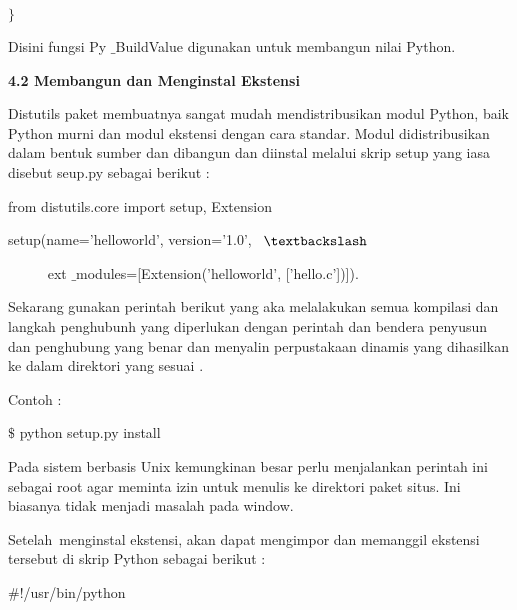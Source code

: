 \noindent 
 $  \}  $ \par
\vspace{12pt}
\vspace{12pt}
\noindent 
 \hspace*{0.5in} Disini fungsi Py $  \_  $BuildValue digunakan untuk membangun nilai Python.  \par
\vspace{12pt}
\vspace{12pt}
\noindent 
\textbf{4.2 Membangun dan Menginstal Ekstensi} \par
\vspace{12pt}
\vspace{12pt}
\noindent 
 \hspace*{0.5in} Distutils paket membuatnya sangat mudah mendistribusikan modul Python, baik Python murni dan modul ekstensi dengan cara standar. Modul didistribusikan dalam bentuk sumber dan dibangun dan diinstal melalui skrip setup yang iasa disebut seup.py sebagai berikut : \par
\noindent 
from distutils.core import setup, Extension \par
\noindent 
setup(name='helloworld', version='1.0',~  $  \textbackslash  $ \par
\noindent 
~~~~~ ext $  \_  $modules=[Extension('helloworld', ['hello.c'])]). \par
\vspace{12pt}
\noindent 
 \hspace*{0.5in} Sekarang gunakan perintah berikut yang aka melalakukan semua kompilasi dan langkah penghubunh yang diperlukan dengan perintah dan bendera penyusun dan penghubung yang benar dan menyalin perpustakaan dinamis yang dihasilkan ke dalam direktori yang sesuai . \par
\vspace{12pt}
\noindent 
Contoh : \par
\noindent 
 $  \$  $ python setup.py install \par
\vspace{12pt}
\noindent 
 \hspace*{0.5in} Pada sistem berbasis Unix kemungkinan besar perlu menjalankan perintah ini sebagai root agar meminta izin untuk menulis ke direktori paket situs. Ini biasanya tidak menjadi masalah pada window. \par
Setelah~menginstal ekstensi, akan dapat mengimpor dan memanggil ekstensi tersebut di skrip Python  sebagai berikut : \par
\noindent 
 $  \#  $!/usr/bin/python \par
